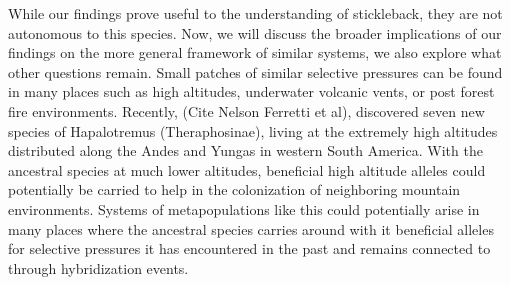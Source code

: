 \documentclass{article}
\begin{document}
While our findings prove useful to the understanding of stickleback, they are not autonomous to this species. 
Now, we will discuss the broader implications of our findings on the more general framework of similar systems, we also explore what other questions remain. 
Small patches of similar selective pressures can be found in many places such as high altitudes, underwater volcanic vents, or post forest fire environments. 
Recently, (Cite Nelson Ferretti et al), discovered seven new species of Hapalotremus (Theraphosinae), living at the extremely high altitudes distributed along the Andes and Yungas in western South America.
With the ancestral species at much lower altitudes, beneficial high altitude alleles could potentially be carried to help in the colonization of neighboring mountain environments. 
Systems of metapopulations like this could potentially arise in many places
where the ancestral species carries around with it beneficial alleles for
 selective pressures it has encountered in the past and remains connected to through hybridization events.
 
 
\end{document}
